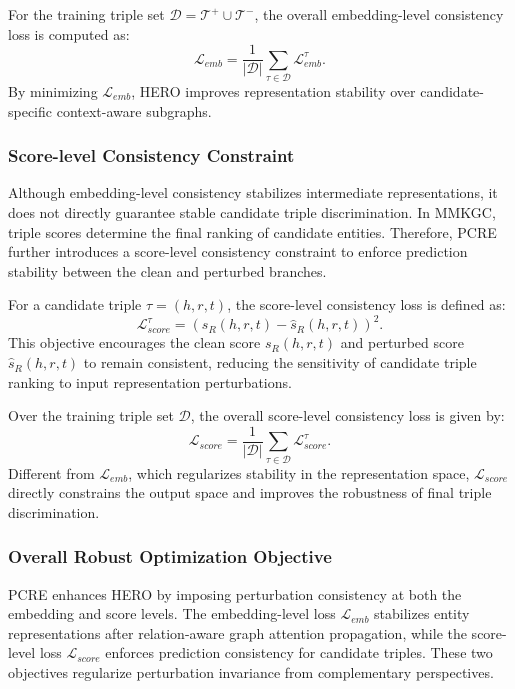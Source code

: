 \documentclass[a4paper,fleqn]{cas-sc}
\begin{document}
For the training triple set $\mathcal{D}=\mathcal{T}^{+}\cup\mathcal{T}^{-}$, the overall embedding-level consistency loss is computed as:
\begin{equation}
\mathcal{L}_{emb}
=
\frac{1}{|\mathcal{D}|}
\sum_{\tau\in\mathcal{D}}
\mathcal{L}_{emb}^{\tau}.
\end{equation}
By minimizing $\mathcal{L}_{emb}$, HERO improves representation stability over candidate-specific context-aware subgraphs.

\subsubsection{Score-level Consistency Constraint}

Although embedding-level consistency stabilizes intermediate representations, it does not directly guarantee stable candidate triple discrimination. In MMKGC, triple scores determine the final ranking of candidate entities. Therefore, PCRE further introduces a score-level consistency constraint to enforce prediction stability between the clean and perturbed branches.

For a candidate triple $\tau=(h,r,t)$, the score-level consistency loss is defined as:
\begin{equation}
\mathcal{L}_{score}^{\tau}
=
\left(
s_R(h,r,t)
-
\widehat{s}_R(h,r,t)
\right)^{2}.
\end{equation}
This objective encourages the clean score $s_R(h,r,t)$ and perturbed score $\widehat{s}_R(h,r,t)$ to remain consistent, reducing the sensitivity of candidate triple ranking to input representation perturbations.

Over the training triple set $\mathcal{D}$, the overall score-level consistency loss is given by:
\begin{equation}
\mathcal{L}_{score}
=
\frac{1}{|\mathcal{D}|}
\sum_{\tau\in\mathcal{D}}
\mathcal{L}_{score}^{\tau}.
\end{equation}
Different from $\mathcal{L}_{emb}$, which regularizes stability in the representation space, $\mathcal{L}_{score}$ directly constrains the output space and improves the robustness of final triple discrimination.

\subsubsection{Overall Robust Optimization Objective}

PCRE enhances HERO by imposing perturbation consistency at both the embedding and score levels. The embedding-level loss $\mathcal{L}_{emb}$ stabilizes entity representations after relation-aware graph attention propagation, while the score-level loss $\mathcal{L}_{score}$ enforces prediction consistency for candidate triples. These two objectives regularize perturbation invariance from complementary perspectives.
\end{document}
